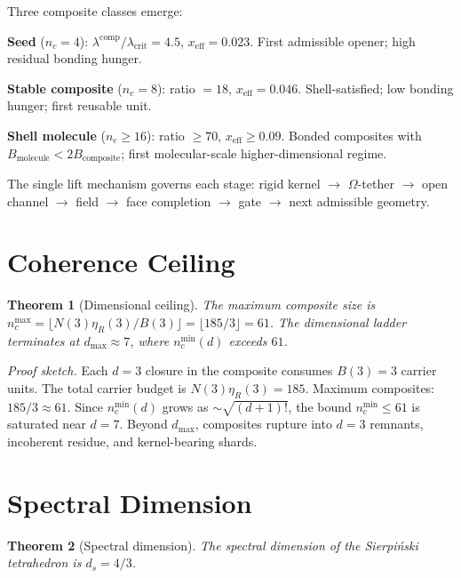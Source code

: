 \documentclass[11pt,twocolumn]{article}
\newtheorem{theorem}{Theorem}
\begin{document}
Three composite classes emerge:

\textbf{Seed} ($n_c=4$): $\lambda^{\mathrm{comp}}/\lambda_{\mathrm{crit}}=4.5$, $x_{\mathrm{eff}}=0.023$.
First admissible opener; high residual bonding hunger.

\textbf{Stable composite} ($n_c=8$): ratio $=18$, $x_{\mathrm{eff}}=0.046$.
Shell-satisfied; low bonding hunger; first reusable unit.

\textbf{Shell molecule} ($n_c\geq 16$): ratio $\geq 70$, $x_{\mathrm{eff}}\geq 0.09$.
Bonded composites with $B_{\mathrm{molecule}}<2B_{\mathrm{composite}}$; first molecular-scale higher-dimensional regime.

The single lift mechanism governs each stage: rigid kernel $\to$ $\Omega$-tether $\to$ open channel $\to$ field $\to$ face completion $\to$ gate $\to$ next admissible geometry.

\section{Coherence Ceiling}
\label{sec:ceiling}

\begin{theorem}[Dimensional ceiling]
\label{thm:ceiling}
The maximum composite size is $n_c^{\max}=\lfloor N(3)\eta_R(3)/B(3)\rfloor=\lfloor 185/3\rfloor=61$.
The dimensional ladder terminates at $d_{\max}\approx 7$, where $n_c^{\min}(d)$ exceeds $61$.
\end{theorem}

\textit{Proof sketch.}
Each $d=3$ closure in the composite consumes $B(3)=3$ carrier units.
The total carrier budget is $N(3)\eta_R(3)=185$.
Maximum composites: $185/3\approx 61$.
Since $n_c^{\min}(d)$ grows as $\sim\sqrt{(d+1)!}$, the bound $n_c^{\min}\leq 61$ is saturated near $d=7$.
Beyond $d_{\max}$, composites rupture into $d=3$ remnants, incoherent residue, and kernel-bearing shards.

\section{Spectral Dimension}
\label{sec:spectral}

\begin{theorem}[Spectral dimension]
\label{thm:ds}
The spectral dimension of the Sierpi\'nski tetrahedron is $d_s=4/3$.
\end{theorem}
\end{document}
